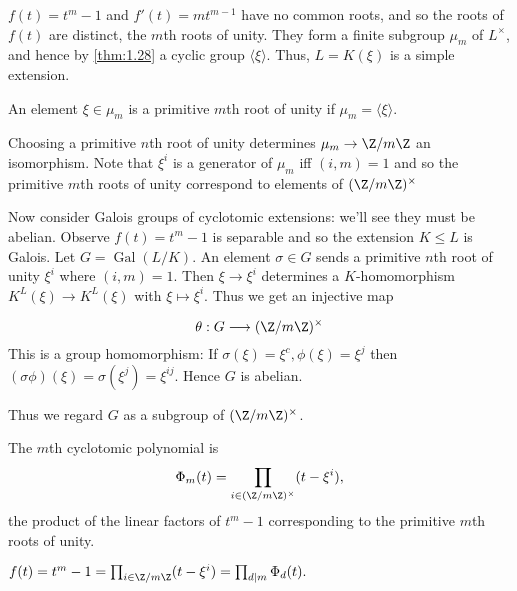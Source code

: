 \documentclass{article}
\DeclareMathOperator{\Gal}{Gal}
\begin{document}
\begin{remark}
    $f(t) = t^m - 1$ and $f'(t) = m t^{m-1}$ have no common roots, and so the roots of $f(t)$ are distinct, the $m$th roots of unity.
    They form a finite subgroup $\mu_m$ of $L^\times$, and hence by \cref{thm:1.28} a cyclic group $\langle \xi \rangle$.
    Thus, $L = K(\xi)$ is a simple extension.
\end{remark}

\begin{ndef}\label{def:4.2}
    An element $\xi \in \mu_m$ is a primitive $m$th root of unity if $\mu_m = \langle \xi \rangle$.
\end{ndef}
Choosing a primitive $n$th root of unity determines $\mu_m \to \Z /m\Z$ an isomorphism.
Note that $\xi^i$ is a generator of $\mu_m$ iff $(i, m) = 1$ and so the primitive $m$th roots of unity correspond to elements of $(\Z/m\Z)^\times$

Now consider Galois groups of cyclotomic extensions: we'll see they must be abelian.
Observe $f(t) = t^m - 1$ is separable and so the extension $K \leq L$ is Galois.
Let $G = \Gal(L/K)$.
An element $\sigma \in G$ sends a primitive $n$th root of unity $\xi^i$ where $(i, m) = 1$.
Then $\xi \to \xi^i$ determines a $K$-homomorphism $K^L(\xi) \to K^L(\xi)$ with $\xi \mapsto \xi^i$.
Thus we get an injective map
\begin{ndef}\label{def:4.3}
    \begin{equation*}
        \theta: G \longrightarrow (\Z/m\Z)^\times
    \end{equation*}
    This is a group homomorphism:
    If $\sigma(\xi) = \xi^c, \phi(\xi) = \xi^j$ then $(\sigma\phi)(\xi) = \sigma(\xi^j) = \xi^{ij}$.
    Hence $G$ is abelian.

    Thus we regard $G$ as a subgroup of $(\Z/m\Z)^\times$.
\end{ndef}

\begin{ndef}\label{def:4.4}
    The $m$th cyclotomic polynomial is
    \begin{equation*}
        \Phi_m(t) = \prod _{i \in (\Z/m\Z)^\times} (t - \xi^i),
    \end{equation*}
    the product of the linear factors of $t^m-1$ corresponding to the primitive $m$th roots of unity.
\end{ndef}

\begin{remark}
    $f(t) = t^m - 1 = \prod_{i \in \Z/m\Z} (t - \xi^i) = \prod _{d \mid m} \Phi_d(t).$
\end{remark}
\end{document}
